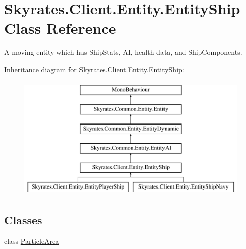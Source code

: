 \hypertarget{class_skyrates_1_1_client_1_1_entity_1_1_entity_ship}{\section{Skyrates.\-Client.\-Entity.\-Entity\-Ship Class Reference}
\label{class_skyrates_1_1_client_1_1_entity_1_1_entity_ship}
}


A moving entity which has Ship\-Stats, A\-I, health data, and Ship\-Components.  


Inheritance diagram for Skyrates.\-Client.\-Entity.\-Entity\-Ship\-:\begin{figure}[H]
\begin{center}
\leavevmode
\includegraphics[height=6.000000cm]{class_skyrates_1_1_client_1_1_entity_1_1_entity_ship}
\end{center}
\end{figure}
\subsection*{Classes}
\begin{DoxyCompactItemize}
\item 
class \hyperlink{class_skyrates_1_1_client_1_1_entity_1_1_entity_ship_1_1_particle_area}{Particle\-Area}
\end{DoxyCompactItemize}
